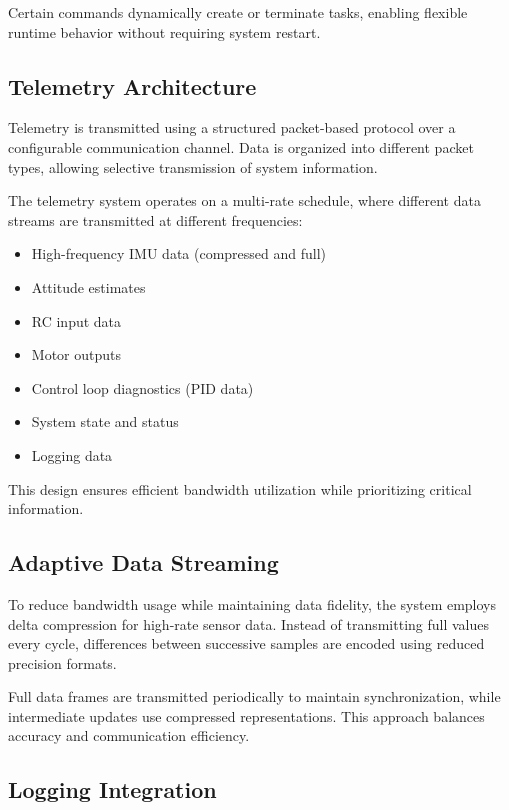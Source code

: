 Certain commands dynamically create or terminate tasks, enabling flexible runtime behavior without requiring system restart.

\subsection{Telemetry Architecture}

Telemetry is transmitted using a structured packet-based protocol over a configurable communication channel. Data is organized into different packet types, allowing selective transmission of system information.

The telemetry system operates on a multi-rate schedule, where different data streams are transmitted at different frequencies:

\begin{itemize}
    \item High-frequency IMU data (compressed and full)
    \item Attitude estimates
    \item RC input data
    \item Motor outputs
    \item Control loop diagnostics (PID data)
    \item System state and status
    \item Logging data
\end{itemize}

This design ensures efficient bandwidth utilization while prioritizing critical information.

\subsection{Adaptive Data Streaming}

To reduce bandwidth usage while maintaining data fidelity, the system employs delta compression for high-rate sensor data. Instead of transmitting full values every cycle, differences between successive samples are encoded using reduced precision formats.

Full data frames are transmitted periodically to maintain synchronization, while intermediate updates use compressed representations. This approach balances accuracy and communication efficiency.

\subsection{Logging Integration}

